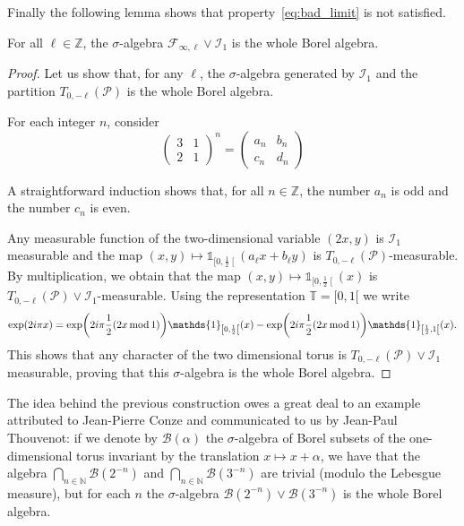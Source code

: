 \documentclass[AHL,Unicode,longabstracts,published]{cedram}
\DeclareMathOperator{\modd}{mod}
\newcommand{\bbT}{\mathbb{T}}
\newcommand{\Z}{\mathbb{Z}}
\newcommand*\N{\mathbb{N}}
\newcommand*\I{\mathcal{I}}
\newcommand*\B{\mathcal{B}}
\newcommand*\F{\mathcal{F}}
\renewcommand*\P{\mathcal{P}}
\newcommand{\ind}[1]{{\mathds{1}}_{#1}}
\let\originalleft\left
\let\originalright\right
\renewcommand{\left}{\mathopen{}\mathclose\bgroup\originalleft}
\renewcommand{\right}{\aftergroup\egroup\originalright}
\begin{document}
Finally the following lemma shows that property~\eqref{eq:bad_limit} is not satisfied.

\begin{lemm}
For all $\ell\in\Z$, the $\sigma$-algebra $\F_{\infty,\ell}\vee\I_1$ is the whole Borel algebra.
\end{lemm}

\begin{proof}
Let us show that, for any $\ell$, the $\sigma$-algebra generated by $\I_1$ and the partition $T_{0,-\ell}(\P)$ is the whole Borel algebra.

For each integer $n$, consider
\[
\begin{pmatrix}3&1\\2&1
\end{pmatrix}^n=
\begin{pmatrix}a_n&b_n\\c_n&d_n
\end{pmatrix}
\]

A straightforward induction shows that, for all $n\in\Z$, the number $a_n$ is odd and the number $c_n$ is even.

Any measurable function of the two-dimensional variable $(2x,y)$ is $\I_1$ measurable and the map $(x,y)\mapsto\ind{[0,\frac12\mathclose{[}}(a_\ell x+b_\ell y)$ is $T_{0,-\ell }(\P)$-measurable. By multiplication, we obtain that the map $(x,y)\mapsto\ind{[0,\frac12\mathclose{[}}(x)$ is $T_{0,-\ell }(\P)\vee\I_1$-measurable. Using the representation $\bbT=[0,1[$ we write
\[
\exp(2i\pi x)=\exp\left(2i\pi\frac12(2x\modd 1)\right)\ind{\left[0,\frac12\right[}(x)-\exp\left(2i\pi\frac12(2x\modd 1)\right)\ind{\left[\frac12,1\right[}(x).
\]
This shows that any character of the two dimensional torus is $T_{0,-\ell }(\P)\vee\I_1$ measurable, proving that this $\sigma$-algebra is the whole Borel algebra.
\end{proof}
\begin{rema}
The idea behind the previous construction owes a great deal to an example attributed to Jean-Pierre Conze and communicated to us by Jean-Paul Thouvenot: if we denote by $\B(\alpha)$ the $\sigma$-algebra of Borel subsets of the one-dimensional torus invariant by the translation $x\mapsto x+\alpha$, we have that the algebra $
\bigcap_{n\in\N}\B(2^{-n})$ and $\bigcap_{n\in\N}\B(3^{-n}) $ are trivial (modulo the Lebesgue measure), but for each $n$ the $\sigma$-algebra $
\B(2^{-n})\vee\B(3^{-n}) $ is the whole Borel algebra.
\end{rema}




\end{document}
